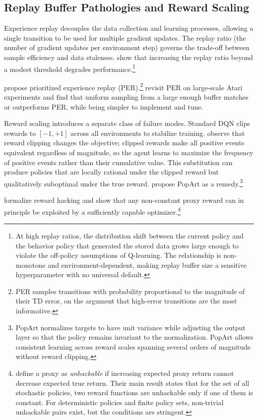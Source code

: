 \subsection{Replay Buffer Pathologies and Reward Scaling}
\label{sec:replay_reward}

Experience replay \citep{Lin1992} decouples the data collection and learning processes, allowing a single transition to be used for multiple gradient updates. The replay ratio (the number of gradient updates per environment step) governs the trade-off between sample efficiency and data staleness. \citet{Zhang2017replay} show that increasing the replay ratio beyond a modest threshold degrades performance.\footnote{At high replay ratios, the distribution shift between the current policy and the behavior policy that generated the stored data grows large enough to violate the off-policy assumptions of Q-learning. The relationship is non-monotone and environment-dependent, making replay buffer size a sensitive hyperparameter with no universal default.}

\citet{schaul2016prioritized} propose prioritized experience replay (PER).\footnote{PER samples transitions with probability proportional to the magnitude of their TD error, on the argument that high-error transitions are the most informative.} \citet{fedus2020revisiting} revisit PER on large-scale Atari experiments and find that uniform sampling from a large enough buffer matches or outperforms PER, while being simpler to implement and tune.

Reward scaling introduces a separate class of failure modes. Standard DQN \citep{mnih2015} clips rewards to $[-1, +1]$ across all environments to stabilize training. \citet{vanHasselt2016popart} observe that reward clipping changes the objective; clipped rewards make all positive events equivalent regardless of magnitude, so the agent learns to maximize the frequency of positive events rather than their cumulative value. This substitution can produce policies that are locally rational under the clipped reward but qualitatively suboptimal under the true reward. \citet{vanHasselt2016popart} propose PopArt as a remedy.\footnote{PopArt normalizes targets to have unit variance while adjusting the output layer so that the policy remains invariant to the normalization. PopArt allows consistent learning across reward scales spanning several orders of magnitude without reward clipping.}

\citet{Skalse2022} formalize reward hacking and show that any non-constant proxy reward can in principle be exploited by a sufficiently capable optimizer.\footnote{\citet{Skalse2022} define a proxy as \emph{unhackable} if increasing expected proxy return cannot decrease expected true return. Their main result states that for the set of all stochastic policies, two reward functions are unhackable only if one of them is constant. For deterministic policies and finite policy sets, non-trivial unhackable pairs exist, but the conditions are stringent.}

